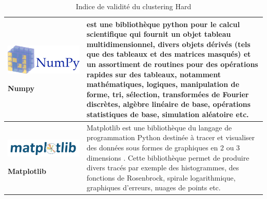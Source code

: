 \begin{table}[H]
\begin{tabular}{|m{5cm}|m{12cm}|}
  \begin{center}
	    \begin{minipage}{.3\textwidth}
      \includegraphics[width=\textwidth]{images/chapitre7/numpy.png}
    \end{minipage}
	\end{center}
	\centering \textbf{Numpy} \cite{2020NumPy-Array} & est une bibliothèque python pour le calcul scientifique qui fournit un objet tableau multidimensionnel, divers objets dérivés (tels que des tableaux et des matrices masqués) et un assortiment de routines pour des opérations rapides sur des tableaux, notamment mathématiques, logiques, manipulation de forme, tri, sélection, transformées de Fourier discrètes, algèbre linéaire de base, opérations statistiques de base, simulation aléatoire etc.  \\ \hline
  \begin{center}
    \begin{minipage}{.3\textwidth}
    \includegraphics[width=\textwidth]{images/chapitre7/matplotlib.png}
  \end{minipage}
  \end{center}
  \centering \textbf{Matplotlib} \cite{hunter2007matplotlib} & Matplotlib est une bibliothèque du langage de programmation Python destinée à tracer et visualiser des données sous formes de graphiques en 2 ou 3 dimensions \cite{tosi2009matplotlib}. Cette bibliothèque permet de produire divers tracés par exemple des histogrammes, des fonctions de Rosenbrock, spirale logarithmique, graphiques d'erreurs, nuages de points etc.  \\ \hline

  \end{tabular}
	\caption{Indice de validité du clustering Hard}
	\label{tools}
\end{table}

